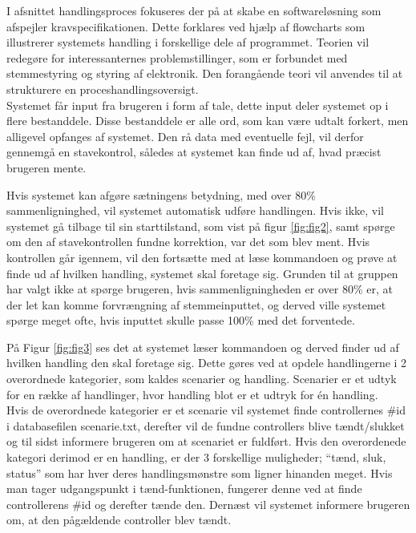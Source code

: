 \label{sec:handlingsproces}
I afsnittet handlingsproces fokuseres der på at skabe en softwareløsning som afspejler kravspecifikationen. Dette forklares ved hjælp af flowcharts som illustrerer systemets handling i forskellige dele af programmet. Teorien vil redegøre for interessanternes problemstillinger, som er forbundet med stemmestyring og styring af elektronik. Den forangående teori vil anvendes til at strukturere en proceshandlingsoversigt.\\

Systemet får input fra brugeren i form af tale, dette input deler systemet op i flere bestanddele. Disse bestanddele er alle ord, som kan være udtalt forkert, men alligevel opfanges af systemet. Den rå data med eventuelle fejl, vil derfor gennemgå en stavekontrol, således at systemet kan finde ud af, hvad præcist brugeren mente.

Hvis systemet kan afgøre sætningens betydning, med over 80\% sammenligninghed, vil systemet automatisk udføre handlingen. Hvis ikke, vil systemet gå tilbage til sin starttilstand, som vist på figur \ref{fig:fig2}, samt spørge om den af stavekontrollen fundne korrektion, var det som blev ment.
Hvis kontrollen går igennem, vil den fortsætte med at læse kommandoen og prøve at finde ud af hvilken handling, systemet skal foretage sig. Grunden til at gruppen har valgt ikke at spørge brugeren, hvis sammenligningheden er over 80\% er, at der let kan komme forvrængning af stemmeinputtet, og derved ville systemet spørge meget ofte, hvis inputtet skulle passe 100\% med det forventede.

På Figur \ref{fig:fig3} ses det at systemet læser kommandoen og derved finder ud af hvilken handling den skal foretage sig. Dette gøres ved at opdele handlingerne i 2 overordnede kategorier, som kaldes scenarier og handling. Scenarier er et udtyk for en række af handlinger, hvor handling blot er et udtryk for én handling.
\\
Hvis de overordnede kategorier er et scenarie vil systemet finde controllernes \#id i databasefilen scenarie.txt, derefter vil de fundne controllers blive tændt/slukket og til sidst informere brugeren om at scenariet er fuldført.
Hvis den overordenede kategori derimod er en handling, er der 3 forskellige muligheder; “tænd, sluk, status” som har hver deres handlingsmønstre som ligner hinanden meget. Hvis man tager udgangspunkt i tænd-funktionen, fungerer denne ved at finde controllerens \#id og derefter tænde den. Dernæst vil systemet informere brugeren om, at den pågældende controller blev tændt.\\

